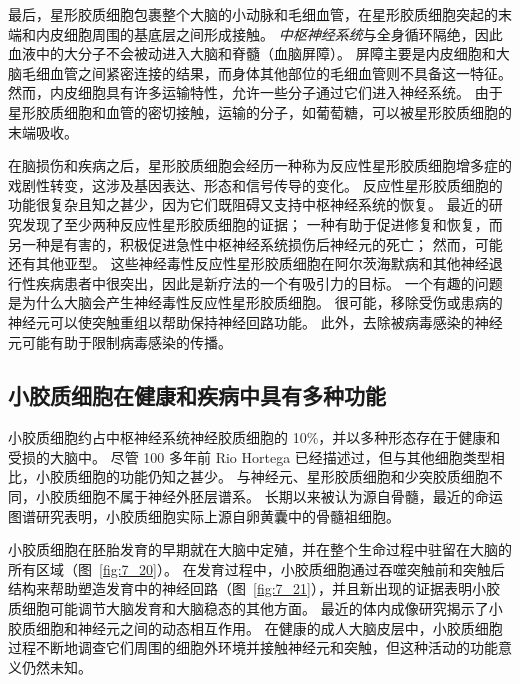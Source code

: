 最后，星形胶质细胞包裹整个大脑的小动脉和毛细血管，在星形胶质细胞突起的末端和内皮细胞周围的基底层之间形成接触。
\textit{中枢神经系统}与全身循环隔绝，因此血液中的大分子不会被动进入大脑和脊髓（血脑屏障）。
屏障主要是内皮细胞和大脑毛细血管之间紧密连接的结果，而身体其他部位的毛细血管则不具备这一特征。
然而，内皮细胞具有许多运输特性，允许一些分子通过它们进入神经系统。
由于星形胶质细胞和血管的密切接触，运输的分子，如葡萄糖，可以被星形胶质细胞的末端吸收。


在脑损伤和疾病之后，星形胶质细胞会经历一种称为反应性星形胶质细胞增多症的戏剧性转变，这涉及基因表达、形态和信号传导的变化。
反应性星形胶质细胞的功能很复杂且知之甚少，因为它们既阻碍又支持中枢神经系统的恢复。
最近的研究发现了至少两种反应性星形胶质细胞的证据；
一种有助于促进修复和恢复，而另一种是有害的，积极促进急性中枢神经系统损伤后神经元的死亡；
然而，可能还有其他亚型。
这些神经毒性反应性星形胶质细胞在阿尔茨海默病和其他神经退行性疾病患者中很突出，因此是新疗法的一个有吸引力的目标。
一个有趣的问题是为什么大脑会产生神经毒性反应性星形胶质细胞。
很可能，移除受伤或患病的神经元可以使突触重组以帮助保持神经回路功能。
此外，去除被病毒感染的神经元可能有助于限制病毒感染的传播。


\subsection{小胶质细胞在健康和疾病中具有多种功能}

小胶质细胞约占中枢神经系统神经胶质细胞的 10\%，并以多种形态存在于健康和受损的大脑中。
尽管 100 多年前 Rio Hortega 已经描述过，但与其他细胞类型相比，小胶质细胞的功能仍知之甚少。
与神经元、星形胶质细胞和少突胶质细胞不同，小胶质细胞不属于神经外胚层谱系。
长期以来被认为源自骨髓，最近的命运图谱研究表明，小胶质细胞实际上源自卵黄囊中的骨髓祖细胞。


小胶质细胞在胚胎发育的早期就在大脑中定殖，并在整个生命过程中驻留在大脑的所有区域（图~\ref{fig:7_20}）。
在发育过程中，小胶质细胞通过吞噬突触前和突触后结构来帮助塑造发育中的神经回路（图~\ref{fig:7_21}），并且新出现的证据表明小胶质细胞可能调节大脑发育和大脑稳态的其他方面。
最近的体内成像研究揭示了小胶质细胞和神经元之间的动态相互作用。
在健康的成人大脑皮层中，小胶质细胞过程不断地调查它们周围的细胞外环境并接触神经元和突触，但这种活动的功能意义仍然未知。


